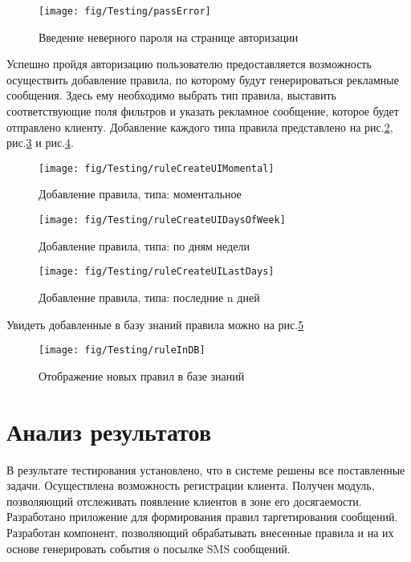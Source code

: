 \begin{figure}[H]
	\centering
	\texttt{[image: fig/Testing/passError]}
	\caption{Введение неверного пароля на странице авторизации}
	\label{fig:passError}
\end{figure}

Успешно пройдя авторизацию пользователю предоставляется возможность осуществить добавление правила, по которому будут генерироваться рекламные сообщения. Здесь ему необходимо выбрать тип правила, выставить соответствующие поля фильтров и указать рекламное сообщение, которое будет отправлено клиенту. Добавление каждого типа правила представлено на рис.\ref{fig:ruleCreateUIMomental}, рис.\ref{fig:ruleCreateUIDaysOfWeek} и рис.\ref{fig:ruleCreateUILastDays}.

\begin{figure}[H]
	\centering
	\texttt{[image: fig/Testing/ruleCreateUIMomental]}
	\caption{Добавление правила, типа: моментальное}
	\label{fig:ruleCreateUIMomental}
\end{figure}

\begin{figure}[H]
	\centering
	\texttt{[image: fig/Testing/ruleCreateUIDaysOfWeek]}
	\caption{Добавление правила, типа: по дням недели}
	\label{fig:ruleCreateUIDaysOfWeek}
\end{figure}

\begin{figure}[H]
	\centering
	\texttt{[image: fig/Testing/ruleCreateUILastDays]}
	\caption{Добавление правила, типа: последние n дней}
	\label{fig:ruleCreateUILastDays}
\end{figure}

Увидеть добавленные в базу знаний правила можно на рис.\ref{fig:ruleInDB}

\begin{figure}[H]
	\centering
	\texttt{[image: fig/Testing/ruleInDB]}
	\caption{Отображение новых правил в базе знаний}
	\label{fig:ruleInDB}
\end{figure}

\section{Анализ результатов}

В результате тестирования установлено, что в системе решены все поставленные задачи. Осуществлена возможность регистрации клиента. Получен модуль, позволяющий отслеживать появление клиентов в зоне его досягаемости. Разработано приложение для формирования правил таргетирования сообщений. Разработан компонент, позволяющий обрабатывать внесенные правила и на их основе генерировать события о посылке SMS сообщений.

